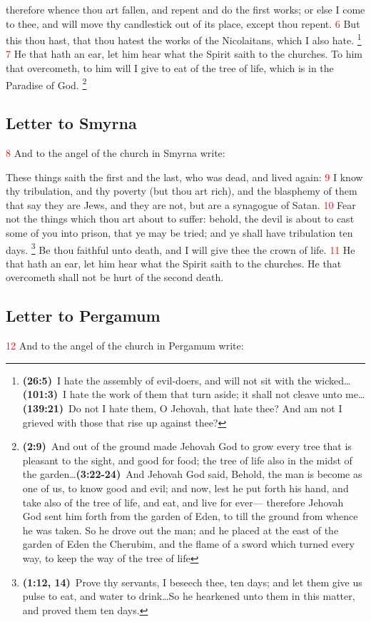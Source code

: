 \documentclass[12pt,twoside]{memoir}
\newcommand{\cbibleref}[3]{\textbf{\ibibleverse{#1}(#2)}\ {#3}}
\newcommand{\cbiblechvs}[3]{\textbf{\ibiblechvs{#1}(#2)}\ {#3}}
\newcommand{\cbiblefoot}[3]{\footnote{\cbibleref{#1}{#2}{#3}}}
\newcommand{\cbiblefootduosb}[5]{\footnote{\cbibleref{#1}{#2}{#3}\ldots \cbiblechvs{#1}{#4}{#5}}} %
\newcommand{\cbiblefoottriosb}[7]{\footnote{\cbibleref{#1}{#2}{#3}\ldots \cbiblechvs{#1}{#4}{#5}\ldots \cbiblechvs{#1}{#6}{#7}}}
\newcommand{\vnum}[1]{\textcolor{red}{\normalsize{#1}}}
\begin{document}
therefore whence thou art fallen, and repent and do the first works; or else I come to thee, and will move thy candlestick out of its place, except thou repent. %
\vnum{6} But this thou hast, that thou hatest the works of the Nicolaitans, which I also hate.%
	\cbiblefoottriosb{Psalms}{26:5}{I hate the assembly of evil-doers, and will not sit with the wicked}%
			{101:3}{I hate the work of them that turn aside; it shall not cleave unto me}%
			{139:21}{Do not I hate them, O Jehovah, that hate thee? And am not I grieved with those that rise up against thee?} %
\vnum{7} He that hath an ear, let him hear what the Spirit saith to the churches. To him that overcometh, to him will I give to eat of the tree of life, which is in the Paradise of God.%
	\cbiblefootduosb{Genesis}{2:9}{And out of the ground made Jehovah God to grow every tree that is pleasant to the sight, and good for food; the tree of life also in the midst of the garden}%
				{3:22-24}{And Jehovah God said, Behold, the man is become as one of us, to know good and evil; and now, lest he put forth his hand, and take also of the tree of life, and eat, and live for ever— therefore Jehovah God sent him forth from the garden of Eden, to till the ground from whence he was taken. So he drove out the man; and he placed at the east of the garden of Eden the Cherubim, and the flame of a sword which turned every way, to keep the way of the tree of life}
\subsection*{Letter to Smyrna}
\vnum{8} And to the angel of the church in Smyrna write:

These things saith the first and the last, who was dead, and lived again: %
\vnum{9} I know thy tribulation, and thy poverty (but thou art rich), and the blasphemy of them that say they are Jews, and they are not, but are a synagogue of Satan. %
\vnum{10} Fear not the things which thou art about to suffer: behold, the devil is about to cast some of you into prison, that ye may be tried; and ye shall have tribulation ten days.%
	\cbiblefoot{Daniel}{1:12, 14}{Prove thy servants, I beseech thee, ten days; and let them give us pulse to eat, and water to drink\ldots So he hearkened unto them in this matter, and proved them ten days.}%
 Be thou faithful unto death, and I will give thee the crown of life. %
\vnum{11} He that hath an ear, let him hear what the Spirit saith to the churches. He that overcometh shall not be hurt of the second death.
\subsection*{Letter to Pergamum}
\vnum{12} And to the angel of the church in Pergamum write:
\end{document}
